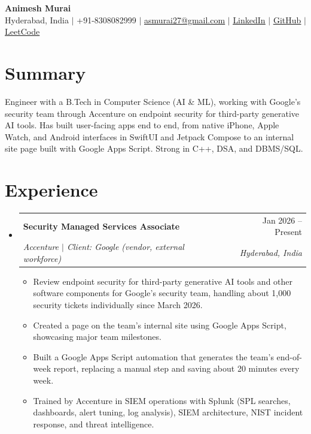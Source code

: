 \documentclass[a4paper,11pt]{article}
\makeatletter
\newcommand{\resumeItem}[1]{\item\small{#1\vspace{-1pt}}}
\newcommand{\resumeSubheading}[4]{
  \vspace{-1pt}\item
    \begin{tabularx}{0.97\textwidth}[t]{@{}>{\raggedright\arraybackslash}X@{\hspace{0.75em}}r@{}}
      \textbf{#1} & #2 \\
      \textit{\small#3} & \textit{\small #4} \\
    \end{tabularx}\vspace{-3pt}
}
\newcommand{\resumeSubItemListStart}{\begin{itemize}[leftmargin=0.15in, label={}]}
\newcommand{\resumeSubItemListEnd}{\end{itemize}}
\newcommand{\resumeItemListStart}{\begin{itemize}[itemsep=2pt]}
\newcommand{\resumeItemListEnd}{\end{itemize}\vspace{-2pt}}
\makeatother
\begin{document}
\begin{center}
    {\Huge\bfseries Animesh Murai} \\ \vspace{4pt}
    \small Hyderabad, India $|$ +91-8308082999 $|$
    \href{mailto:asmurai27@gmail.com}{\underline{asmurai27@gmail.com}} $|$
    \href{https://www.linkedin.com/in/animesh-murai-538384253/}{\underline{LinkedIn}} $|$
    \href{https://github.com/muraias7781}{\underline{GitHub}} $|$
    \href{https://leetcode.com/u/sAMurai7781/}{\underline{LeetCode}}
\end{center}

\section{Summary}
  \small{Engineer with a B.Tech in Computer Science (AI \& ML), working with Google's security team through Accenture on endpoint security for third-party generative AI tools. Has built user-facing apps end to end, from native iPhone, Apple Watch, and Android interfaces in SwiftUI and Jetpack Compose to an internal site page built with Google Apps Script. Strong in C++, DSA, and DBMS/SQL.}

\section{Experience}
  \resumeSubItemListStart

    \resumeSubheading
      {Security Managed Services Associate}{Jan 2026 -- Present}
      {Accenture $|$ Client: Google (vendor, external workforce)}{Hyderabad, India}
      \resumeItemListStart
        \resumeItem{Review endpoint security for third-party generative AI tools and other software components for Google's security team, handling about 1,000 security tickets individually since March 2026.}
        \resumeItem{Created a page on the team's internal site using Google Apps Script, showcasing major team milestones.}
        \resumeItem{Built a Google Apps Script automation that generates the team's end-of-week report, replacing a manual step and saving about 20 minutes every week.}
        \resumeItem{Trained by Accenture in SIEM operations with Splunk (SPL searches, dashboards, alert tuning, log analysis), SIEM architecture, NIST incident response, and threat intelligence.}
      \resumeItemListEnd

  \resumeSubItemListEnd
\end{document}
